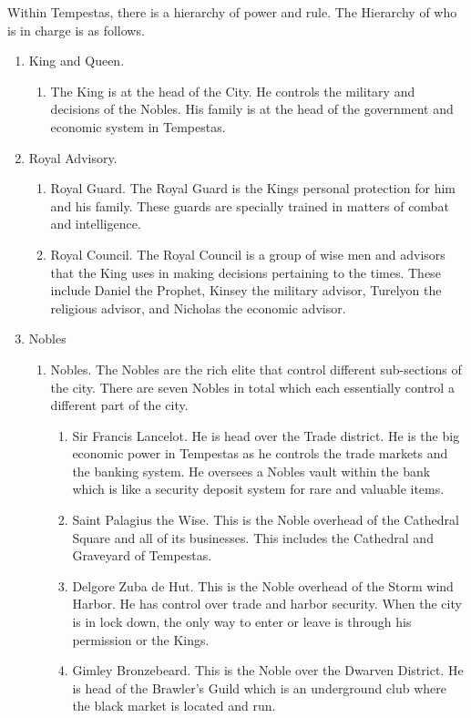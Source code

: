 Within Tempestas, there is a hierarchy of power and rule. The Hierarchy of who is in charge is as follows.
\begin{enumerate}
	\item King and Queen.
	\begin{enumerate}
		\item The King is at the head of the City. He controls the military and decisions of the Nobles. His family is at the head of the government and economic system in Tempestas.
	\end{enumerate}
	\item Royal Advisory.
	\begin{enumerate}
		\item Royal Guard. The Royal Guard is the Kings personal protection for him and his family. These guards are specially trained in matters of combat and intelligence.
		\item Royal Council. The Royal Council is a group of wise men and advisors that the King uses in making decisions pertaining to the times. These include Daniel the Prophet, Kinsey the military advisor, Turelyon the religious advisor, and Nicholas the economic advisor. 
	\end{enumerate}
	\item Nobles
	\begin{enumerate}
		\item Nobles. The Nobles are the rich elite that control different sub-sections of the city. There are seven Nobles in total which each essentially control a different part of the city.
		\begin{enumerate}
			\item Sir Francis Lancelot. He is head over the Trade district. He is the big economic power in Tempestas as he controls the trade markets and the banking system. He oversees a Nobles vault within the bank which is like a security deposit system for rare and valuable items.
			\item Saint Palagius the Wise. This is the Noble overhead of the Cathedral Square and all of its businesses. This includes the Cathedral and Graveyard of Tempestas.
			\item Delgore Zuba de Hut. This is the Noble overhead of the Storm wind Harbor. He has control over trade and harbor security. When the city is in lock down, the only way to enter or leave is through his permission or the Kings. 
			\item Gimley Bronzebeard. This is the Noble over the Dwarven District. He is head of the Brawler's Guild which is an underground club where the black market is located and run.

\end{enumerate}
\end{enumerate}
\end{enumerate}
